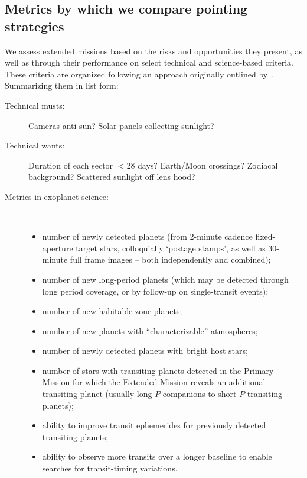\subsection{Metrics by which we compare pointing strategies}
\label{sec:comparing_pointing_strategies}

We assess extended missions based on the risks and opportunities they
present, as well as through their performance on select technical and
science-based criteria.  These criteria are organized following an
approach originally outlined by~\citet{kepner_rational_1965}.
Summarizing them in list form:
\begin{description}
\item[Technical musts:] Cameras anti-sun? Solar panels collecting sunlight?
\item[Technical wants:] Duration of each sector $<28$ days? Earth/Moon crossings? Zodiacal background? Scattered sunlight off lens hood?
\item[Metrics in exoplanet science:]\
	\begin{itemize}
	\item number of newly detected planets (from 2-minute cadence fixed-aperture target stars, colloquially `postage stamps', as well as 30-minute full frame images -- both independently and combined); 
	\item number of new long-period planets (which may be detected through long period coverage, or by follow-up on single-transit events); 
	\item number of new habitable-zone planets; 
	\item number of new planets with ``characterizable'' atmospheres; 
	\item number of newly detected planets with bright host stars; 
	\item number of stars with transiting planets detected in the Primary Mission for which the Extended Mission reveals an additional
          transiting planet (usually long-$P$ companions to short-$P$ transiting planets);
        \item ability to improve transit ephemerides for previously detected transiting planets;
	\item ability to observe more transits over a longer baseline to enable searches for transit-timing variations.
        \end{itemize}
\end{description}

